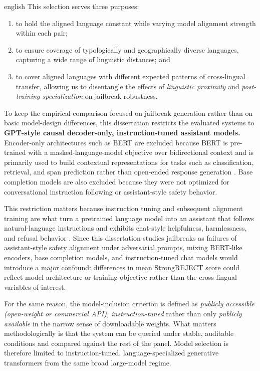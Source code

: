 \begin{otherlanguage*}{english}
This selection serves three purposes:

\begin{enumerate}[label=(\roman*)]
    \item to hold the aligned language constant while varying model alignment strength within each pair;
    \item to ensure coverage of typologically and geographically diverse languages, capturing a wide range of linguistic distances; and
    \item to cover aligned languages with different expected patterns of cross-lingual transfer, allowing us to disentangle the effects of \emph{linguistic proximity} and \emph{post-training specialization} on jailbreak robustness.
\end{enumerate}

To keep the empirical comparison focused on jailbreak generation rather than on basic model-design differences, this dissertation restricts the evaluated systems to \textbf{GPT-style causal decoder-only, instruction-tuned assistant models.} Encoder-only architectures such as BERT are excluded because BERT is pre-trained with a masked-language-model objective over bidirectional context and is primarily used to build contextual representations for tasks such as classification, retrieval, and span prediction rather than open-ended response generation \cite{devlinBERTPretrainingDeep2019}. Base completion models are also excluded because they were not optimized for conversational instruction following or assistant-style safety behavior.

This restriction matters because instruction tuning and subsequent alignment training are what turn a pretrained language model into an assistant that follows natural-language instructions and exhibits chat-style helpfulness, harmlessness, and refusal behavior \cite{weiFinetunedLanguageModels2022,ouyangTrainingLanguageModels2022,touvronLlama2Open2023a,bacciuFaunoItalianLarge2023,OliveiraJLT2024Sagui7BInstruct01,alexandrovBgGPT10Extending2024,ekgren-etal-2024-gpt}. Since this dissertation studies jailbreaks as failures of assistant-style safety alignment under adversarial prompts, mixing BERT-like encoders, base completion models, and instruction-tuned chat models would introduce a major confound: differences in mean StrongREJECT score could reflect model architecture or training objective rather than the cross-lingual variables of interest.

For the same reason, the model-inclusion criterion is defined as \emph{publicly accessible (open-weight or commercial API), instruction-tuned} rather than only \emph{publicly available} in the narrow sense of downloadable weights. What matters methodologically is that the system can be queried under stable, auditable conditions and compared against the rest of the panel. Model selection is therefore limited to instruction-tuned, language-specialized generative transformers from the same broad large-model regime.


\end{otherlanguage*}
